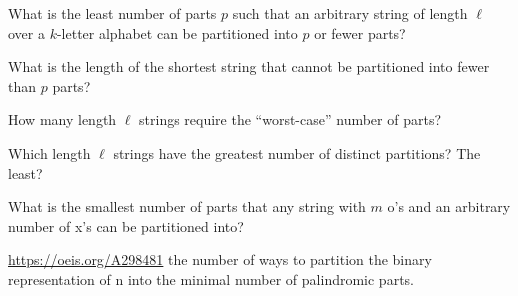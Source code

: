 \documentclass{article}
\begin{document}
\begin{related}
  \item What is the least number of parts $p$ such that an arbitrary string of
    length $\ell$ over a $k$-letter alphabet can be partitioned into $p$ or
    fewer parts?
  \item What is the length of the shortest string that cannot be partitioned
    into fewer than $p$ parts?
  \item How many length $\ell$ strings require the ``worst-case'' number of
    parts?
  \item Which length $\ell$ strings have the greatest number of distinct
    partitions? The least?
  \item What is the smallest number of parts that any string with $m$ o's
    and an arbitrary number of x's can be partitioned into?
\end{related}
\begin{references}
  \item \url{https://oeis.org/A298481} the number of ways to partition the
    binary representation of n into the minimal number of palindromic parts.
\end{references}
\end{document}
